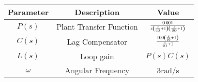 \begin{tabular}{|c|c|c|}
\hline
    Parameter & Description & Value\\
    \hline
    $P(s)$ & Plant Transfer Function & $\frac{0.001}{s\left(\frac{s}{0.5}+1\right)\left(\frac{s}{100}+1\right)}$\\
    \hline
    $C(s)$ & Lag Compensator  & $\frac{100\left(\frac{s}{10}+1\right)}{\frac{s}{0.1}+1}$\\
    \hline
    $L(s)$ & Loop gain  & $P(s) C(s)$ \\
    \hline
    $\omega$ & Angular Frequency & 3rad/s \\
    \hline
\end{tabular}
